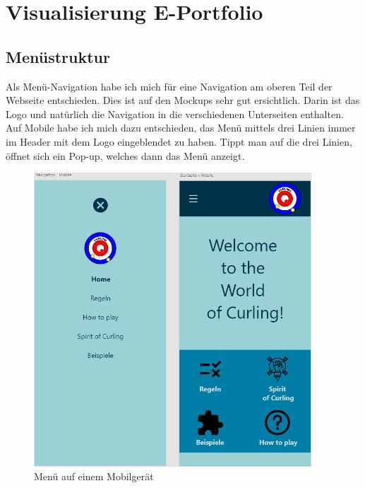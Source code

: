 \documentclass[11pt]{article}
\begin{document}
    \section{Visualisierung E-Portfolio}

    \subsection{Menüstruktur}
    Als Menü-Navigation habe ich mich für eine Navigation am oberen Teil der Webseite entschieden. Dies ist
    auf den Mockups sehr gut ersichtlich. Darin ist das Logo und natürlich die Navigation in die verschiedenen
    Unterseiten enthalten.\\
    Auf Mobile habe ich mich dazu entschieden, das Menü mittels drei Linien immer im Header mit dem Logo
    eingeblendet zu haben. Tippt man auf die drei Linien, öffnet sich ein Pop-up, welches dann das Menü anzeigt.

    \begin{figure}[h]
        \centering
        \includegraphics[height=11cm]{media/menu_mobile}
        \caption{Menü auf einem Mobilgerät}
    \end{figure}

\end{document}
